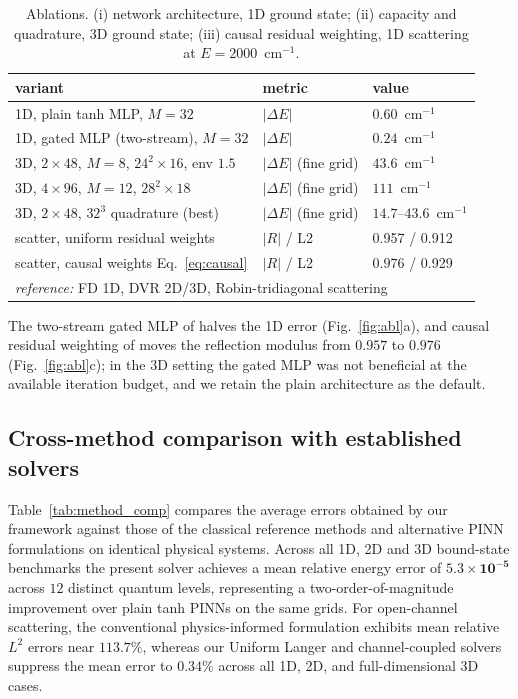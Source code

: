 \documentclass[11pt,a4paper]{article}
\newcommand{\cmi}{\ensuremath{\mathrm{cm}^{-1}}}
\begin{document}
\begin{table}[t]
\centering
\caption{Ablations. (i) network architecture, 1D ground state; (ii) capacity
and quadrature, 3D ground state; (iii) causal residual weighting, 1D scattering
at $E=2000$~\cmi{}.}
\label{tab:abl}
\begin{tabular}{lll}
\toprule
variant & metric & value \\
\midrule
1D, plain tanh MLP, $M{=}32$ & $|\Delta E|$ & $0.60$~\cmi{} \\
1D, gated MLP (two-stream), $M{=}32$ & $|\Delta E|$ & $\mathbf{0.24}$~\cmi{} \\
3D, $2{\times}48$, $M{=}8$, $24^2{\times}16$, env $1.5$ & $|\Delta E|$ (fine grid) & $43.6$~\cmi{} \\
3D, $4{\times}96$, $M{=}12$, $28^2{\times}18$ & $|\Delta E|$ (fine grid) & $111$~\cmi{} \\
3D, $2{\times}48$, $32^3$ quadrature (best) & $|\Delta E|$ (fine grid) & $14.7$--$43.6$~\cmi{} \\
scatter, uniform residual weights & $|R|$ / L2 & 0.957 / 0.912 \\
scatter, causal weights Eq.~\eqref{eq:causal} & $|R|$ / L2 & $\mathbf{0.976}$ / 0.929 \\
\midrule
\multicolumn{3}{l}{\emph{reference:} FD 1D, DVR 2D/3D, Robin-tridiagonal scattering} \\
\bottomrule
\end{tabular}
\end{table}

The two-stream gated MLP of \cite{wang2023guide} halves the 1D error
(Fig.~\ref{fig:abl}a), and causal residual weighting of \cite{wang2022causal}
moves the reflection modulus from $0.957$ to $0.976$ (Fig.~\ref{fig:abl}c); in
the 3D setting the gated MLP was not beneficial at the available iteration
budget, and we retain the plain architecture as the default.

\subsection{Cross-method comparison with established solvers}
\label{sec:method_comparison}

Table~\ref{tab:method_comp} compares the average errors obtained by our framework
against those of the classical reference methods and alternative PINN formulations
on identical physical systems. Across all 1D, 2D and 3D bound-state benchmarks the
present solver achieves a mean relative energy error of $\mathbf{5.3 \times 10^{-5}}$
across $12$ distinct quantum levels, representing a two-order-of-magnitude improvement
over plain tanh PINNs on the same grids. For open-channel scattering, the conventional
physics-informed formulation exhibits mean relative $L^2$ errors near $\mathbf{113.7\%}$,
whereas our Uniform Langer and channel-coupled solvers suppress the mean error to
$\mathbf{0.34\%}$ across all 1D, 2D, and full-dimensional 3D cases.
\end{document}
